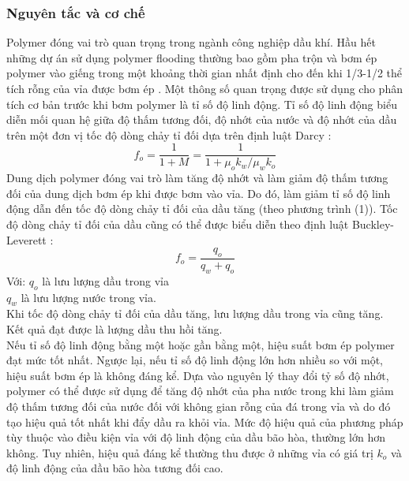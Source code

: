 \documentclass[12pt,a4paper]{article}
\begin{document}
	\subsubsection{Nguyên tắc và cơ chế}
	Polymer đóng vai trò quan trọng trong ngành công nghiệp dầu khí. Hầu hết những dự án sử dụng polymer flooding thường bao gồm pha trộn và bơm ép polymer vào giếng trong một khoảng thời gian nhất định cho đến khi 1/3-1/2 thể tích rỗng của vỉa được bơm ép \cite{abidin2012polymers}. Một thông số quan trọng được sử dụng cho phân tích cơ bản trước khi bơm polymer là tỉ số độ linh động. Tỉ số độ linh động biểu diễn mối quan hệ giữa độ thấm tương đối, độ nhớt của nước và độ nhớt của dầu trên một đơn vị tốc độ dòng chảy tỉ đối dựa trên định luật Darcy \cite{abidin2012polymers}:
		\begin{equation}
			f_o=\frac{1}{1+M}=\frac{1}{1+\mu_{o}k_w/\mu_{w}k_o}
		\end{equation}
	Dung dịch polymer đóng vai trò làm tăng độ nhớt và làm giảm độ thấm tương đối của dung dịch bơm ép khi được bơm vào vỉa. Do đó, làm giảm tỉ số độ linh động dẫn đến tốc độ dòng chảy tỉ đối của dầu tăng (theo phương trình (1)). Tốc độ dòng chảy tỉ đối của dầu cũng có thể được biểu diễn theo định luật Buckley-Leverett \cite{kantzas2012fundamentals}:
		\begin{equation}
			f_o=\frac{q_o}{q_w+q_o}
		\end{equation}
	Với: \hspace*{15pt} $q_o$ là lưu lượng dầu trong vỉa\\
	\hspace*{37pt} $q_w$ là lưu lượng nước trong vỉa.\\
	Khi tốc độ dòng chảy tỉ đối của dầu tăng, lưu lượng dầu trong vỉa cũng tăng. Kết quả đạt được là lượng dầu thu hồi tăng.\\
	Nếu tỉ số độ linh động bằng một hoặc gần bằng một, hiệu suất bơm ép polymer đạt mức tốt nhất. Ngược lại, nếu tỉ số độ linh động lớn hơn nhiều so với một, hiệu suất bơm ép là không đáng kể. Dựa vào nguyên lý thay đổi tỷ số độ nhớt, polymer có thể được sử dụng để tăng độ nhớt của pha nước trong khi làm giảm độ thấm tương đối của nước đối với không gian rỗng của đá trong vỉa và do đó tạo hiệu quả tốt nhất khi đẩy dầu ra khỏi vỉa. Mức độ hiệu quả của phương pháp tùy thuộc vào điều kiện vỉa với độ linh động của dầu bão hòa, thường lớn hơn không. Tuy nhiên, hiệu quả đáng kể thường thu được ở những vỉa có giá trị $k_o$ và độ linh động của dầu bão hòa tương đối cao.
	\newpage
\end{document}
